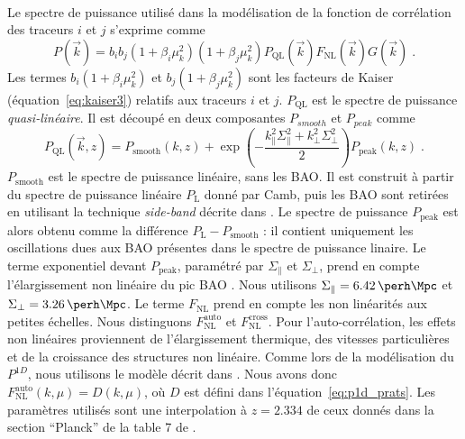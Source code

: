 \documentclass[11pt, twoside, a4paper, openright]{report}
\begin{document}
\paragraph{}
Le spectre de puissance utilisé dans la modélisation de la fonction de corrélation des traceurs $i$ et $j$ s'exprime comme
\begin{equation}
  \label{eq:pk_model1}
  P(\vec k) = b_i b_j (1+\beta_i \mu_k^2)(1+\beta_j \mu_k^2) P_{\mathrm{QL}}(\vec k) F_{\mathrm{NL}}(\vec k) G(\vec k) \; .
\end{equation}
Les termes $b_i (1+\beta_i \mu_k^2)$ et $b_j (1+\beta_j \mu_k^2)$ sont les facteurs de Kaiser (équation~\ref{eq:kaiser3}) relatifs aux traceurs $i$ et $j$.
$P_{\mathrm{QL}}$ est le spectre de puissance \emph{quasi-linéaire}. Il est découpé en deux composantes $P_{smooth}$ et $P_{peak}$ comme
\begin{equation}
  P_{\mathrm{QL}}(\vec k, z) = P_{\mathrm{smooth}}(k, z) + \exp(- \frac{k_{\parallel}^2 \Sigma_{\parallel}^2 + k_{\perp}^2 \Sigma_{\perp}^2}{2}) P_{\mathrm{peak}}(k,z) \; .
\end{equation}
$P_{\mathrm{smooth}}$ est le spectre de puissance linéaire, sans les BAO. Il est construit à partir du spectre de puissance linéaire $P_{\mathrm{L}}$ donné par Camb, puis les BAO sont retirées en utilisant la technique \emph{side-band} décrite dans \citet{Kirkby2013}.
Le spectre de puissance $P_{\mathrm{peak}}$ est alors obtenu comme la différence $P_{\mathrm{L}} - P_{\mathrm{smooth}}$ : il contient uniquement les oscillations dues aux BAO présentes dans le spectre de puissance linaire.
Le terme exponentiel devant $P_{\mathrm{peak}}$, paramétré par $\Sigma_{\parallel}$ et $\Sigma_{\perp}$, prend en compte l'élargissement non linéaire du pic BAO \citep{eisenstein_robustness_2007}. Nous utilisons $\Sigma_{\parallel} = \SI{6.42}{\perh\Mpc}$ et $\Sigma_{\perp} = \SI{3.26}{\perh\Mpc}$.
Le terme $F_{\mathrm{NL}}$ prend en compte les non linéarités aux petites échelles. Nous distinguons $F_{\mathrm{NL}}^{\mathrm{auto}}$ et $F_{\mathrm{NL}}^{\mathrm{cross}}$. Pour l'auto-corrélation, les effets non linéaires proviennent de l'élargissement thermique, des vitesses particulières et de la croissance des structures non linéaire.
Comme lors de la modélisation du $P^{1D}$, nous utilisons le modèle décrit dans \citet{Arinyo-i-Prats2015}. Nous avons donc $F_{\mathrm{NL}}^{\mathrm{auto}}(k, \mu) = D(k, \mu)$, où $D$ est défini dans l'équation~\ref{eq:p1d_prats}. Les paramètres utilisés sont une interpolation à $z = \num{2.334}$ de ceux donnés dans la section ``Planck'' de la table 7 de \citet{Arinyo-i-Prats2015}.
\end{document}

